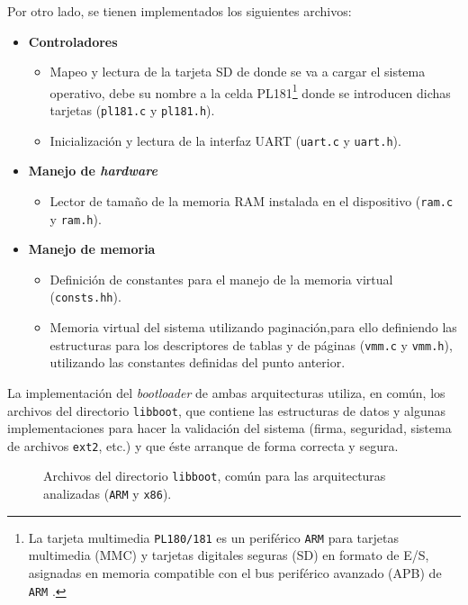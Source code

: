 	
	\clearpage
	Por otro lado, se tienen implementados los siguientes archivos:
	\begin{itemize} \setlength\itemsep{0pt}
		\item \textbf{Controladores}
		\begin{itemize} \setlength\itemsep{0pt}
			\item Mapeo y lectura de la tarjeta SD de donde se va a cargar el sistema operativo, debe su nombre a la celda 
			PL181\footnote{
				La tarjeta multimedia \texttt{PL180/181} es un periférico \texttt{ARM} para tarjetas multimedia (MMC) y tarjetas digitales seguras (SD) en formato de E/S, asignadas en memoria compatible con el bus periférico avanzado (APB) de \texttt{ARM} \cite{pl181}.
			}
			donde se introducen dichas tarjetas (\texttt{pl181.c} y \texttt{pl181.h}).
			
			\item Inicialización y lectura de la interfaz UART (\texttt{uart.c} y \texttt{uart.h}).
		\end{itemize}
	
		\item \textbf{Manejo de \textit{hardware}}
		\begin{itemize} \setlength\itemsep{0pt}
			\item Lector de tamaño de la memoria RAM instalada en el dispositivo (\texttt{ram.c} y \texttt{ram.h}).
		\end{itemize}
	
		\item \textbf{Manejo de memoria}
		\begin{itemize} \setlength\itemsep{0pt}
			\item Definición de constantes para el manejo de la memoria virtual (\texttt{consts.hh}).
			
			\item Memoria virtual del sistema utilizando paginación,para ello definiendo las estructuras para los descriptores de tablas y de páginas (\texttt{vmm.c} y \texttt{vmm.h}), utilizando las constantes definidas del punto anterior.
		\end{itemize}
	\end{itemize}

	
	\newpage
	La implementación del \textit{bootloader} de ambas arquitecturas utiliza, en común, los archivos del directorio \texttt{libboot}, que contiene las estructuras de datos y algunas implementaciones para hacer la validación del sistema (firma, seguridad, sistema de archivos \texttt{ext2}, etc.) y que éste arranque de forma correcta y segura.
	\begin{figure}[ht]
		\centering
		\hspace*{1cm}
		\caption{
			Archivos del directorio \texttt{libboot}, común para las arquitecturas analizadas (\texttt{ARM} y \texttt{x86}).
			\label{fig:libboot}
		}
	\end{figure}

